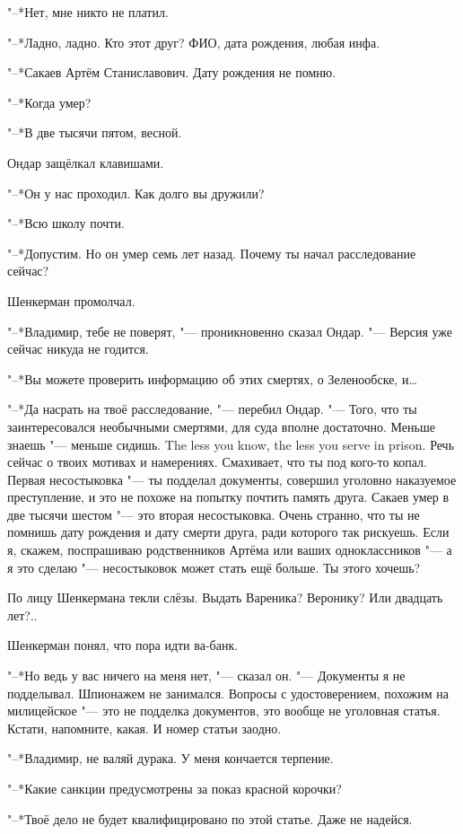 "--*Нет, мне никто не платил.

"--*Ладно, ладно.
Кто этот друг?
ФИО, дата рождения, любая инфа.

"--*Сакаев Артём Станиславович.
Дату рождения не помню.

"--*Когда умер?

"--*В две тысячи пятом, весной.

Ондар защёлкал клавишами.

"--*Он у нас проходил.
Как долго вы дружили?

"--*Всю школу почти.

"--*Допустим.
Но он умер семь лет назад.
Почему ты начал расследование сейчас?

Шенкерман промолчал.

"--*Владимир, тебе не поверят, "--- проникновенно сказал Ондар.
"--- Версия уже сейчас никуда не годится.

"--*Вы можете проверить информацию об этих смертях, о Зеленообске, и\ldots{}

"--*Да насрать на твоё расследование, "--- перебил Ондар.
"--- Того, что ты заинтересовался необычными смертями, для суда вполне достаточно.
{Меньше знаешь "--- меньше сидишь.}
{The less you know, the less you serve in prison.}
Речь сейчас о твоих мотивах и намерениях.
Смахивает, что ты под кого-то копал.
Первая несостыковка "--- ты подделал документы, совершил уголовно наказуемое преступление, и это не похоже на попытку почтить память друга.
Сакаев умер в две тысячи шестом "--- это вторая несостыковка.
Очень странно, что ты не помнишь дату рождения и дату смерти друга, ради которого так рискуешь.
Если я, скажем, поспрашиваю родственников Артёма или ваших одноклассников "--- а я это сделаю "--- несостыковок может стать ещё больше.
Ты этого хочешь?

По лицу Шенкермана текли слёзы.
Выдать Вареника?
Веронику?
Или двадцать лет?..

Шенкерман понял, что пора идти ва-банк.

"--*Но ведь у вас ничего на меня нет, "--- сказал он.
"--- Документы я не подделывал.
Шпионажем не занимался.
Вопросы с удостоверением, похожим на милицейское "--- это не подделка документов, это вообще не уголовная статья.
Кстати, напомните, какая.
И номер статьи заодно.

"--*Владимир, не валяй дурака.
У меня кончается терпение.

"--*Какие санкции предусмотрены за показ красной корочки?

"--*Твоё дело не будет квалифицировано по этой статье.
Даже не надейся.

